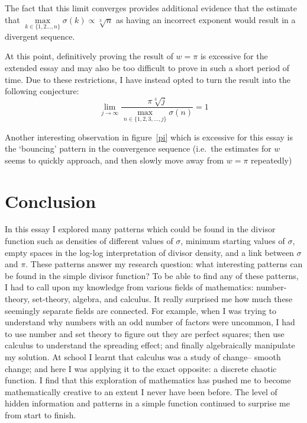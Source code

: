 \documentclass[12pt]{article}
\begin{document}
				The fact that this limit converges provides additional evidence that the estimate that $\max\limits_{k\in\{1,2\ldots,n\}}\sigma(k)\propto \sqrt[3]{n}$ as having an incorrect exponent would result in a divergent sequence.

				At this point, definitively proving the result of $w=\pi$ is excessive for the extended essay and may also be too difficult to prove in such a short period of time. Due to these restrictions, I have instead opted to turn the result into the following conjecture:
				$$\lim_{j\to\infty}\frac{\pi\sqrt[3]{j}}{\max\limits_{n\in\{1,2,3,\ldots,j\}}\sigma(n)}=1$$

				Another interesting observation in figure~\ref{pi} which is excessive for this essay is the `bouncing' pattern in the convergence sequence (i.e.\ the estimates for $w$ seems to quickly approach, and then slowly move away from $w=\pi$ repeatedly)
	\newpage
	\section{Conclusion}
		In this essay I explored many patterns which could be found in the divisor function such as densities of different values of $\sigma$, minimum starting values of $\sigma$, empty spaces in the log-log interpretation of divisor density, and a link between $\sigma$ and $\pi$. These patterns answer my research question: what interesting patterns can be found in the simple divisor function? To be able to find any of these patterns, I had to call upon my knowledge from various fields of mathematics: number-theory, set-theory, algebra, and calculus. It really surprised me how much these seemingly separate fields are connected. For example, when I was trying to understand why numbers with an odd number of factors were uncommon, I had to use number and set theory to figure out they are perfect squares; then use calculus to understand the spreading effect; and finally algebraically manipulate my solution. At school I learnt that calculus was a study of change-- smooth change; and here I was applying it to the exact opposite: a discrete chaotic function. I find that this exploration of mathematics has pushed me to become mathematically creative to an extent I never have been before. The level of hidden information and patterns in a simple function continued to surprise me from start to finish.
\end{document}
